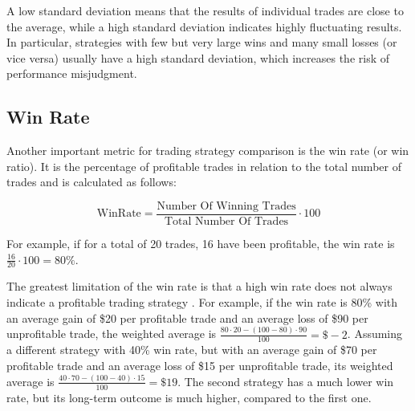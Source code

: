 \noindent
A low standard deviation means that the results of individual trades are close to the average, while a high standard deviation indicates highly fluctuating results.
In particular, strategies with few but very large wins and many small losses (or vice versa) usually have a high standard deviation, which increases the risk of performance misjudgment.

\subsection{Win Rate}
\label{chap:win-rate}

Another important metric for trading strategy comparison is the win rate (or win ratio).
It is the percentage of profitable trades in relation to the total number of trades and is calculated as follows:

\[
    \text{WinRate} = \frac{\text{Number Of Winning Trades}}{\text{Total Number Of Trades}} \cdot 100
\]

\noindent
For example, if for a total of 20 trades, 16 have been profitable, the win rate is $\frac{16}{20} \cdot 100 = 80\%$.

The greatest limitation of the win rate is that a high win rate does not always indicate a profitable trading strategy \cite{win-rate}.
For example, if the win rate is 80\% with an average gain of \$20 per profitable trade and an average loss of \$90 per unprofitable trade, the weighted average is $\frac{80 \cdot 20 - (100 - 80) \cdot 90}{100} = \$-2$.
Assuming a different strategy with 40\% win rate, but with an average gain of \$70 per profitable trade and an average loss of \$15 per unprofitable trade, its weighted average is $\frac{40 \cdot 70 - (100 - 40) \cdot 15}{100} = \$19$.
The second strategy has a much lower win rate, but its long-term outcome is much higher, compared to the first one.
